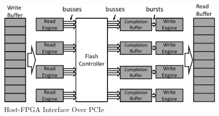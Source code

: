 \begin{figure}[ht!]
	\centering
	\includegraphics[width=0.4	\textwidth]{figures/hostinterface-crop.pdf}
	\caption{Host-FPGA Interface Over PCIe}
	\label{fig:hostinterface}
\end{figure}

